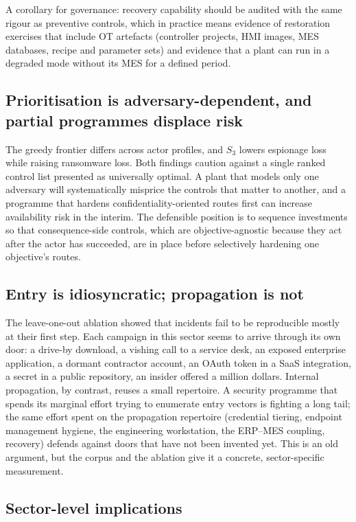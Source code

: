 A corollary for governance: recovery capability should be audited with the same
rigour as preventive controls, which in practice means evidence of restoration
exercises that include OT artefacts (controller projects, HMI images, MES
databases, recipe and parameter sets) and evidence that a plant can run in a
degraded mode without its MES for a defined period.

\subsection{Prioritisation is adversary-dependent, and partial programmes
displace risk}

The greedy frontier differs across actor profiles, and $S_3$ lowers espionage
loss while raising ransomware loss. Both findings caution against a single
ranked control list presented as universally optimal. A plant that models only
one adversary will systematically misprice the controls that matter to another,
and a programme that hardens confidentiality-oriented routes first can increase
availability risk in the interim. The defensible position is to sequence
investments so that consequence-side controls, which are objective-agnostic
because they act after the actor has succeeded, are in place before
selectively hardening one objective's routes.

\subsection{Entry is idiosyncratic; propagation is not}

The leave-one-out ablation showed that incidents fail to be reproducible mostly
at their first step. Each campaign in this sector seems to arrive through its
own door: a drive-by download, a vishing call to a service desk, an exposed
enterprise application, a dormant contractor account, an OAuth token in a SaaS
integration, a secret in a public repository, an insider offered a million
dollars. Internal propagation, by contrast, reuses a small repertoire. A
security programme that spends its marginal effort trying to enumerate entry
vectors is fighting a long tail; the same effort spent on the propagation
repertoire (credential tiering, endpoint management hygiene, the engineering
workstation, the ERP--MES coupling, recovery) defends against doors that
have not been invented yet. This is an old argument, but the corpus and the
ablation give it a concrete, sector-specific measurement.

\subsection{Sector-level implications}

